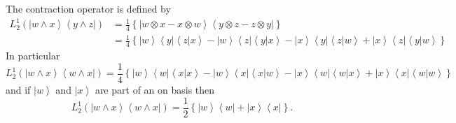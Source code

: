 \documentclass[aps,preprint]{revtex4}%
\begin{document}
The contraction operator is defined by%
\begin{align}
L_{2}^{1}\left(  \left\vert w\wedge x\right\rangle \left\langle y\wedge
z\right\vert \right)   &  =\frac{1}{4}\left\{  \left\vert w\otimes x-x\otimes
w\right\rangle \left\langle y\otimes z-z\otimes y\right\vert \right\}
\nonumber\\
&  =\frac{1}{4}\left\{  \left\vert w\right\rangle \left\langle y\right\vert
\left\langle \left.  z\right\vert x\right\rangle -\left\vert w\right\rangle
\left\langle z\right\vert \left\langle \left.  y\right\vert x\right\rangle
-\left\vert x\right\rangle \left\langle y\right\vert \left\langle \left.
z\right\vert w\right\rangle +\left\vert x\right\rangle \left\langle
z\right\vert \left\langle \left.  y\right\vert w\right\rangle \right\}
\end{align}
In particular%
\begin{equation}
L_{2}^{1}\left(  \left\vert w\wedge x\right\rangle \left\langle w\wedge
x\right\vert \right)  =\frac{1}{4}\left\{  \left\vert w\right\rangle
\left\langle w\right\vert \left\langle \left.  x\right\vert x\right\rangle
-\left\vert w\right\rangle \left\langle x\right\vert \left\langle \left.
x\right\vert w\right\rangle -\left\vert x\right\rangle \left\langle
w\right\vert \left\langle \left.  w\right\vert x\right\rangle +\left\vert
x\right\rangle \left\langle x\right\vert \left\langle \left.  w\right\vert
w\right\rangle \right\}
\end{equation}
and if $\left\vert w\right\rangle $ and $\left\vert x\right\rangle $ are part
of an on basis then
\begin{equation}
L_{2}^{1}\left(  \left\vert w\wedge x\right\rangle \left\langle w\wedge
x\right\vert \right)  =\frac{1}{2}\left\{  \left\vert w\right\rangle
\left\langle w\right\vert +\left\vert x\right\rangle \left\langle x\right\vert
\right\}  .
\end{equation}%
\end{document}
